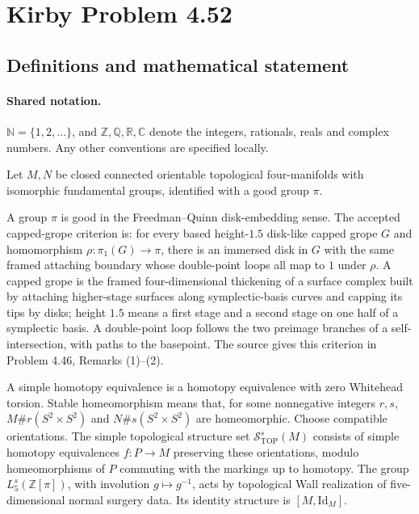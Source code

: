 \documentclass[11pt]{article}
\begin{document}
\section{Kirby Problem 4.52}\label{statement}

\subsection{Definitions and mathematical statement}

\paragraph{Shared notation.}$\mathbb N=\{1,2,\ldots\}$, and $\mathbb Z,\mathbb Q,\mathbb R,\mathbb C$ denote the integers, rationals, reals and complex numbers. Any other conventions are specified locally.


Let $M,N$ be closed connected orientable topological four-manifolds with isomorphic fundamental groups, identified with a good group $\pi$.

A group $\pi$ is good in the Freedman--Quinn disk-embedding sense. The accepted capped-grope criterion is: for every based height-$1.5$ disk-like capped grope $G$ and homomorphism $\rho:\pi_1(G)\to\pi$, there is an immersed disk in $G$ with the same framed attaching boundary whose double-point loops all map to $1$ under $\rho$. A capped grope is the framed four-dimensional thickening of a surface complex built by attaching higher-stage surfaces along symplectic-basis curves and capping its tips by disks; height $1.5$ means a first stage and a second stage on one half of a symplectic basis. A double-point loop follows the two preimage branches of a self-intersection, with paths to the basepoint. The source gives this criterion in Problem 4.46, Remarks (1)--(2).

A simple homotopy equivalence is a homotopy equivalence with zero Whitehead torsion. Stable homeomorphism means that, for some nonnegative integers $r,s$, $M\#r(S^2\times S^2)$ and $N\#s(S^2\times S^2)$ are homeomorphic. Choose compatible orientations. The simple topological structure set $\mathcal S^s_{\mathrm{TOP}}(M)$ consists of simple homotopy equivalences $f:P\to M$ preserving these orientations, modulo homeomorphisms of $P$ commuting with the markings up to homotopy. The group $L_5^s(\mathbb Z[\pi])$, with involution $g\mapsto g^{-1}$, acts by topological Wall realization of five-dimensional normal surgery data. Its identity structure is $[M,\mathrm{Id}_M]$.
\end{document}
